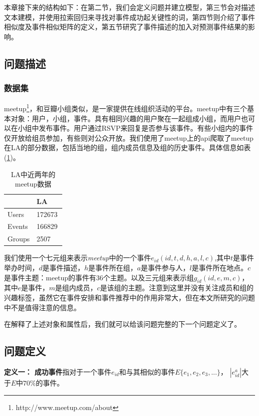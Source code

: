 \documentclass[12pt]{template}
\begin{document}
本章接下来的结构如下：在第二节，我们会定义问题并建立模型，第三节会对描述文本建模，并使用拉索回归来寻找对事件成功起关键性的词，第四节则介绍了事件相似度及事件相似矩阵的定义，第五节研究了事件描述的加入对预测事件结果的影响。

\subsection{问题描述}
\subsubsection{数据集}
meetup\footnote{http://www.meetup.com/about}，和豆瓣小组类似，是一家提供在线组织活动的平台。meetup中有三个基本对象：用户，小组，事件。具有相同兴趣的用户聚在一起组成小组，而用户也可以在小组中发布事件。用户通过RSVP来回复是否参与该事件。有些小组内的事件仅开放给组员参加，有些则对公众开放。我们使用了meetup上的api爬取了meetup在LA的部分数据，包括当地的组，组内成员信息及组的历史事件。具体信息如表(\ref{t1-1})。

\begin{table}[htb] 
  \centering  
  \caption{\label{t1-1}LA中近两年的meetup数据}
    \begin{tabular*}{\linewidth}{p{0.5\linewidth}p{0.5\linewidth}}
\toprule
    & LA \\
\midrule
    Users & 172673\\
    Events & 166829\\
    Groups & 2507\\
\bottomrule
    \end{tabular*}
\end{table}

我们使用一个七元组来表示\textit{meetup}中的一个事件\(e_{id}(id,t,d,h,a,l,c)\),其中\(t\)是事件举办时间，\(d\)是事件描述，\(h\)是事件所在组，\(a\)是事件参与人，\(l\)是事件所在地点。\(c\)是事件主题：meetup的事件有36个主题。以及三元组来表示组\(g_{id}(id,e,m,c)\)，其中\(e\)是事件，\(m\)是组内成员，\(c\)是该组的主题。注意到这里并没有关注成员和组的兴趣标签，虽然它在事件安排和事件推荐中的作用非常大，但在本文所研究的问题中不是值得注意的信息。

在解释了上述对象和属性后，我们就可以给该问题完整的下一个问题定义了。

\subsection{问题定义}
\textbf{定义一： 成功事件}指对于一个事件\(e_{id}\)和与其相似的事件\(E\{e_1,e_2,e_3,...\}\)，
\(|e_{id}^a|\)大于\(E\)中\(70\)\%的事件。
\end{document}
